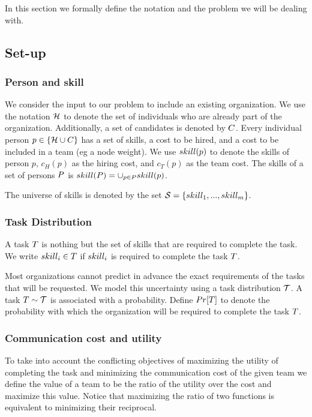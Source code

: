 In this section we formally define the notation and the problem we will be dealing with.
\subsection{Set-up}

\subsubsection{Person and skill}

We consider the input to our problem to include an existing organization.
We use the notation $\mathcal{H}$ to denote the set of individuals who are already part of the organization.
Additionally, a set of candidates is denoted by ${C}$.
Every individual person $p \in \{\mathcal{H} \cup {C}\}$ has a set of skills, a cost to be hired, and a cost to be included in a team (eg a node weight).
We use $skill(p)$ to denote the skills of person $p$, $c_H(p)$ as the hiring cost, and $c_T(p)$ as the team cost.
The skills of a set of persons $P$ is $skill(P) = \cup_{p \in P} skill(p)$.

The universe of skills is denoted by the set $\mathcal{S} = \{ skill_1, ..., skill_m \}$.

\subsubsection{Task Distribution}

A task $T$ is nothing but the set of skills that are required to complete the task.
We write $skill_i \in T$ if $skill_i$ is required to complete the task $T$.

Most organizations cannot predict in advance the exact requirements of the tasks that will be requested.
We model this uncertainty using a task distribution $\mathcal{T}$. 
A task $T \sim \mathcal{T}$ is associated with a probability.
Define $Pr[T]$ to denote the probability with which the organization will be required to complete the task $T$. 

\subsubsection{Communication cost and utility}

To take into account the conflicting objectives of maximizing the utility of completing the task and minimizing the communication cost of the given team we define the value of a team to be the ratio of the utility over the cost and maximize this value. Notice that maximizing the ratio of two functions is equivalent to minimizing their reciprocal.  

